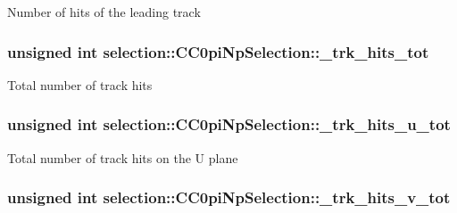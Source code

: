Number of hits of the leading track \hypertarget{classselection_1_1CC0piNpSelection_a420b9962478d7998282e03f1ccf89c2e}{
\subsubsection[{\-\_\-trk\-\_\-hits\-\_\-tot}]{\setlength{\rightskip}{0pt plus 5cm}unsigned int selection\-::\-C\-C0pi\-Np\-Selection\-::\-\_\-trk\-\_\-hits\-\_\-tot\hspace{0.3cm}{\ttfamily [private]}}}\label{classselection_1_1CC0piNpSelection_a420b9962478d7998282e03f1ccf89c2e}
Total number of track hits \hypertarget{classselection_1_1CC0piNpSelection_af7d0e867df8901ff3e531b4c1b96408a}{
\subsubsection[{\-\_\-trk\-\_\-hits\-\_\-u\-\_\-tot}]{\setlength{\rightskip}{0pt plus 5cm}unsigned int selection\-::\-C\-C0pi\-Np\-Selection\-::\-\_\-trk\-\_\-hits\-\_\-u\-\_\-tot\hspace{0.3cm}{\ttfamily [private]}}}\label{classselection_1_1CC0piNpSelection_af7d0e867df8901ff3e531b4c1b96408a}
Total number of track hits on the U plane \hypertarget{classselection_1_1CC0piNpSelection_a30fe5ccb6a299f7955125aa6c9d5923d}{
\subsubsection[{\-\_\-trk\-\_\-hits\-\_\-v\-\_\-tot}]{\setlength{\rightskip}{0pt plus 5cm}unsigned int selection\-::\-C\-C0pi\-Np\-Selection\-::\-\_\-trk\-\_\-hits\-\_\-v\-\_\-tot\hspace{0.3cm}{\ttfamily [private]}}}\label{classselection_1_1CC0piNpSelection_a30fe5ccb6a299f7955125aa6c9d5923d}
